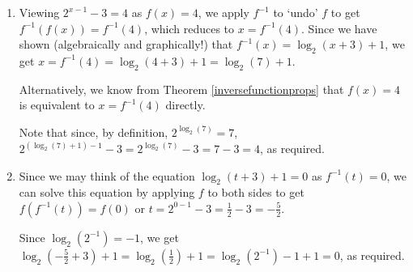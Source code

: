 \documentclass{ximera}
\begin{document}
\begin{example}
\begin{explanation}
\begin{enumerate}
\end{enumerate}

\begin{enumerate}

\item  Viewing $2^{x-1} - 3 = 4$ as $f(x) = 4$, we apply $f^{-1}$ to `undo' $f$ to get $f^{-1}(f(x)) = f^{-1}(4)$, which reduces to $x = f^{-1}(4)$.  Since we have shown (algebraically and graphically!) that $f^{-1}(x) =  \log_{2}(x+3) + 1$, we get  $x = f^{-1}(4) = \log_{2}(4+3) + 1 = \log_{2}(7) + 1$. 

 

Alternatively, we know from Theorem \ref{inversefunctionprops} that $f(x) = 4$ is equivalent to $x = f^{-1}(4)$ directly.

 


Note  that since, by definition,  $2^{\log_{2}(7)} = 7$,  $2^{( \log_{2}(7) + 1)-1} - 3 = 2^{\log_{2}(7)} - 3  = 7 - 3 = 4$, as required.

\item  Since we may think of the equation $\log_{2}(t+3)+1 = 0$ as $f^{-1}(t) = 0$, we can solve this equation by applying $f$ to both sides to get $f(f^{-1}(t)) = f(0)$ or $t = 2^{0-1} -3 = \frac{1}{2} - 3 = -\frac{5}{2}$.

Since $\log_{2}(2^{-1}) = -1$, we get  $\log_{2}\left(-\frac{5}{2} +3 \right)+1 = \log_{2}\left( \frac{1}{2} \right) + 1 =  \log_{2}(2^{-1})-1 + 1 = 0$, as required. 

\end{enumerate}

\end{explanation}
\end{example}


\closegraphsfile
\end{document}

